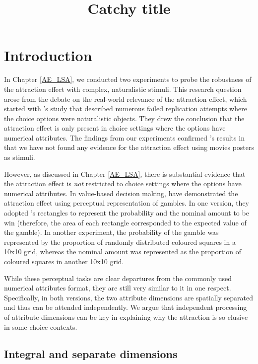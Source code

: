 \documentclass[11pt,a4paper]{article}
\date{}
\title{\huge{Catchy title}}
\begin{document}
\maketitle


\section{Introduction} 

In Chapter \ref{AE_LSA}, we conducted two experiments to probe the robustness of the attraction effect with complex, naturalistic stimuli. This research question arose from the debate on the real-world relevance of the attraction effect, which started with \citeauthor{Frederick2014}'s study that described numerous failed replication attempts where the choice options were naturalistic objects. They drew the conclusion that the attraction effect is only present in choice settings where the options have numerical attributes. The findings from our experiments confirmed \citeauthor{Frederick2014}'s results in that we have not found any evidence for the attraction effect using movies posters as stimuli.

However, as discussed in Chapter  \ref{AE_LSA}, there is substantial evidence that the attraction effect is \textit{not} restricted to choice settings where the options have numerical attributes. In value-based decision making,  have demonstrated the attraction effect using perceptual representation of gambles. In one version, they adopted 's rectangles to represent the probability and the nominal amount to be win (therefore, the area of each rectangle corresponded to the expected value of the gamble). In another experiment, the probability of the gamble was represented by the proportion of randomly distributed coloured squares in a 10x10 grid, whereas the nominal amount was represented as the proportion of coloured squares in another 10x10 grid. 

While these perceptual tasks are clear departures from the commonly used numerical attributes format, they are still very similar to it in one respect. Specifically, in both versions, the two attribute dimensions are spatially separated and thus can be attended independently. We argue that independent processing of attribute dimensions can be key in explaining why the attraction is so elusive in some choice contexts.

\subsection{Integral and separate dimensions} 
\end{document}
